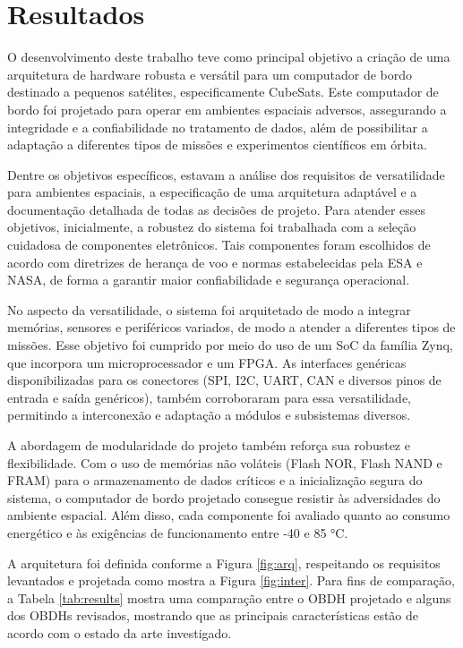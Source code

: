 \chapter{Resultados}
O desenvolvimento deste trabalho teve como principal objetivo a criação de uma arquitetura de hardware robusta e versátil para um computador de bordo destinado a pequenos satélites, especificamente CubeSats. Este computador de bordo foi projetado para operar em ambientes espaciais adversos, assegurando a integridade e a confiabilidade no tratamento de dados, além de possibilitar a adaptação a diferentes tipos de missões e experimentos científicos em órbita.

Dentre os objetivos específicos, estavam a análise dos requisitos de versatilidade para ambientes espaciais, a especificação de uma arquitetura adaptável e a documentação detalhada de todas as decisões de projeto. Para atender esses objetivos, inicialmente, a robustez do sistema foi trabalhada com a seleção cuidadosa de componentes eletrônicos. Tais componentes foram escolhidos de acordo com diretrizes de herança de voo e normas estabelecidas pela ESA e NASA, de forma a garantir maior confiabilidade e segurança operacional.

No aspecto da versatilidade, o sistema foi arquitetado de modo a integrar memórias, sensores e periféricos variados, de modo a atender a diferentes tipos de missões. Esse objetivo foi cumprido por meio do uso de um SoC da família Zynq, que incorpora um microprocessador e um FPGA. As interfaces genéricas disponibilizadas para os conectores (SPI, I2C, UART, CAN e diversos pinos de entrada e saída genéricos), também corroboraram para essa versatilidade, permitindo a interconexão e adaptação a módulos e subsistemas diversos.

A abordagem de modularidade do projeto também reforça sua robustez e flexibilidade. Com o uso de memórias não voláteis (Flash NOR, Flash NAND e FRAM) para o armazenamento de dados críticos e a inicialização segura do sistema, o computador de bordo projetado consegue resistir às adversidades do ambiente espacial. Além disso, cada componente foi avaliado quanto ao consumo energético e às exigências de funcionamento entre -40 e 85 °C.

A arquitetura foi definida conforme a Figura \ref{fig:arq}, respeitando os requisitos levantados e projetada como mostra a Figura \ref{fig:inter}. Para fins de comparação, a Tabela \ref{tab:results} mostra uma comparação entre o OBDH projetado e alguns dos OBDHs revisados, mostrando que as principais características estão de acordo com o estado da arte investigado.

